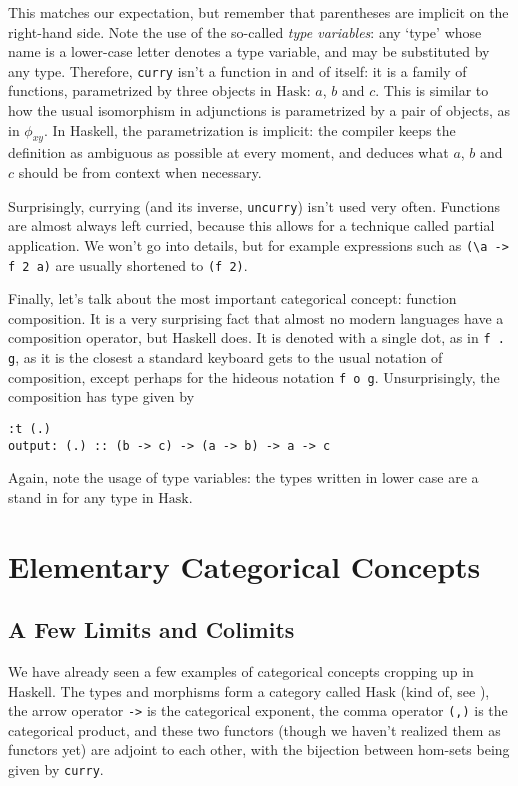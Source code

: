 \documentclass[11pt]{article}
\theoremstyle{nonumberplain}
\newcommand{\Hask}{\mathrm{Hask}}
\newcommand*\lsin{\lstinline}
\begin{document}
This matches our expectation, but remember that parentheses are implicit on the right-hand side. Note the use of the so-called \emph{type variables}: any `type' whose name is a lower-case letter denotes a type variable, and may be substituted by any type. Therefore, \lsin|curry| isn't a function in and of itself: it is a family of functions, parametrized by three objects in $\Hask$: $a$, $b$ and $c$. This is similar to how the usual isomorphism in adjunctions is parametrized by a pair of objects, as in $\phi_{xy}$. In Haskell, the parametrization is implicit: the compiler keeps the definition as ambiguous as possible at every moment, and deduces what $a$, $b$ and $c$ should be from context when necessary.

Surprisingly, currying (and its inverse, \lsin|uncurry|) isn't used very often. Functions are almost always left curried, because this allows for a technique called partial application. We won't go into details, but for example expressions such as \lsin|(\a -> f 2 a)| are usually shortened to \lsin|(f 2)|.

Finally, let's talk about the most important categorical concept: function composition. It is a very surprising fact that almost no modern languages have a composition operator, but Haskell does. It is denoted with a single dot, as in \lsin|f . g|, as it is the closest a standard keyboard gets to the usual notation of composition, except perhaps for the hideous notation \lsin|f o g|. Unsurprisingly, the composition has type given by
\begin{lstlisting}
:t (.)
output: (.) :: (b -> c) -> (a -> b) -> a -> c
\end{lstlisting}

Again, note the usage of type variables: the types written in lower case are a stand in for any type in $\Hask$.


\section{Elementary Categorical Concepts}

\subsection{A Few Limits and Colimits}\label{limcolim}

We have already seen a few examples of categorical concepts cropping up in Haskell. The types and morphisms form a category called $\Hask$ (kind of, see \cite{haskisnotcat}), the arrow operator \lsin|->| is the categorical exponent, the comma operator \lsin|(,)| is the categorical product, and these two functors (though we haven't realized them as functors yet) are adjoint to each other, with the bijection between hom-sets being given by \lsin|curry|.
\end{document}
